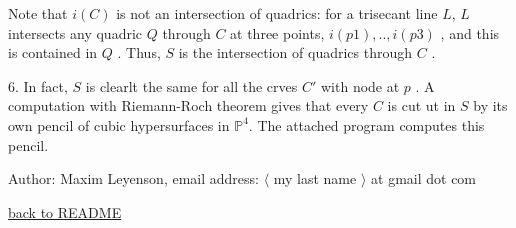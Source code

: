 \documentclass{amsart} %
\newcommand{\<}{\langle }
\renewcommand{\>}{\rangle }
\begin{document}
Note that $ i(C) $ is not an intersection of quadrics: for a trisecant line $ L $,
$ L$ intersects any quadric  $ Q $ through $C$ at three points, $  i(p1),.., i(p3) $ ,
and this is contained in $ Q $ . Thus, $ S $ is the intersection of quadrics through
$ C $ .


\vspace{10mm} %

6. In fact, $ S $ is clearlt the same for all the crves $C'$ with node
at $ p $  . A computation with Riemann-Roch theorem gives that every $C$ is cut ut in $ S $ 
by its own pencil of cubic hypersurfaces in $\mathbb{P}^4$. The attached program computes this pencil.


\vspace{10mm} %
Author: Maxim Leyenson, email address: $\<$ my last name $ \> $ at gmail dot com 


\vspace{10mm} %

 \href{../README.md}{back to README}
\end{document}
